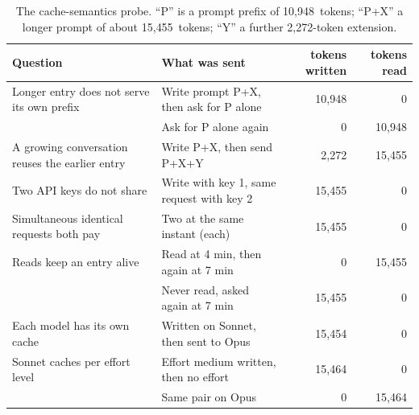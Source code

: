 \documentclass[11pt,letterpaper]{article}
\newcommand{\ProbeFullTokens}{15{,}455}
\newcommand{\ProbePTokens}{10{,}948}
\newcommand{\ProbeYTokens}{2{,}272}
\begin{document}
\begin{table}[tbp]
\centering\small
\caption{The cache-semantics probe. ``P'' is a prompt prefix of \ProbePTokens\ tokens; ``P+X'' a longer
prompt of about \ProbeFullTokens\ tokens; ``Y'' a further \ProbeYTokens-token extension.}
\label{vt:tab:probe}
{\footnotesize\setlength{\tabcolsep}{2pt}%
\begin{tabular*}{\textwidth}{@{\extracolsep{\fill}}>{\raggedright\arraybackslash}p{} >{\raggedright\arraybackslash}p{} r r@{}}
\toprule
Question & What was sent & tokens written & tokens read \\
\midrule
Longer entry does not serve its own prefix & Write prompt P+X, then ask for P alone & 10{,}948 & 0 \\
 & Ask for P alone again & 0 & 10{,}948 \\
A growing conversation reuses the earlier entry & Write P+X, then send P+X+Y & 2{,}272 & 15{,}455 \\
Two API keys do not share & Write with key 1, same request with key 2 & 15{,}455 & 0 \\
Simultaneous identical requests both pay & Two at the same instant (each) & 15{,}455 & 0 \\
Reads keep an entry alive & Read at 4 min, then again at 7 min & 0 & 15{,}455 \\
 & Never read, asked again at 7 min & 15{,}455 & 0 \\
Each model has its own cache & Written on Sonnet, then sent to Opus & 15{,}454 & 0 \\
Sonnet caches per effort level & Effort medium written, then no effort & 15{,}464 & 0 \\
 & Same pair on Opus & 0 & 15{,}464 \\
\bottomrule
\end{tabular*}
}
\end{table}
\end{document}
